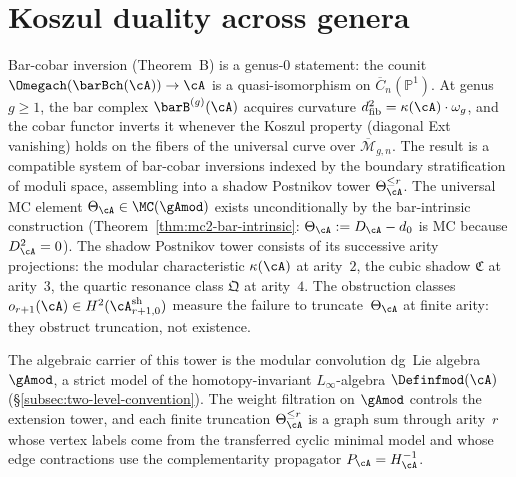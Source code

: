\section{Koszul duality across genera}\label{sec:koszul-across-genera}\label{app:koszul_higher_genus}

Bar-cobar inversion (Theorem~B) is a genus-$0$ statement: the counit
$\Omegach(\barBch(\cA)) \to \cA$ is a quasi-isomorphism on
$\overline{C}_n(\mathbb{P}^1)$.  At genus~$g \geq 1$, the bar complex
$\barB^{(g)}(\cA)$ acquires curvature
$d_{\mathrm{fib}}^2 = \kappa(\cA) \cdot \omega_g$, and the cobar
functor inverts it whenever the Koszul property (diagonal Ext
vanishing) holds on the fibers of the universal curve over
$\overline{\mathcal{M}}_{g,n}$.  The result is a compatible system of
bar-cobar inversions indexed by the boundary stratification of moduli
space, assembling into a shadow Postnikov tower
$\Theta_\cA^{\leq r}$.  The universal MC element
$\Theta_\cA \in \MC(\gAmod)$ exists unconditionally by the
bar-intrinsic construction
(Theorem~\ref{thm:mc2-bar-intrinsic}: $\Theta_\cA := D_\cA - d_0$
is MC because $D_\cA^2 = 0$).  The shadow Postnikov tower consists of
its successive arity projections: the modular characteristic
$\kappa(\cA)$ at arity~$2$, the cubic shadow $\mathfrak{C}$ at
arity~$3$, the quartic resonance class $\mathfrak{Q}$ at arity~$4$.
The obstruction classes
$o_{r+1}(\cA) \in H^2(\cA^{\mathrm{sh}}_{r+1,0})$ measure
the failure to truncate~$\Theta_\cA$ at finite arity: they
obstruct truncation, not existence.

The algebraic carrier of this tower is the modular convolution dg~Lie
algebra~$\gAmod$, a strict model of the homotopy-invariant
$L_\infty$-algebra $\Definfmod(\cA)$
(\S\ref{subsec:two-level-convention}).  The weight filtration on
$\gAmod$ controls the extension tower, and each finite truncation
$\Theta_\cA^{\leq r}$ is a graph sum through arity~$r$ whose vertex
labels come from the transferred cyclic minimal model and whose edge
contractions use the complementarity propagator
$P_\cA = H_\cA^{-1}$.

